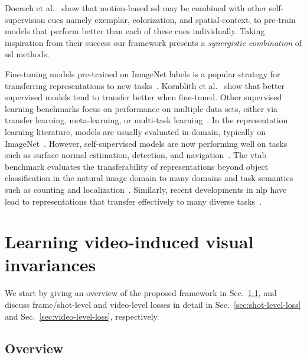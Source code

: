\documentclass[10pt,twocolumn,letterpaper]{article}
\renewcommand{\paragraph}[1]{\noindent{\bf #1}\quad}
\begin{document}
Doersch et al.\ \cite{doersch2017multi} show that motion-based \gls{ssl} may be combined with other self-supervision cues namely exemplar, colorization, and spatial-context, to pre-train models that perform better than each of these cues individually. Taking inspiration from their success our framework presents a \emph{synergistic combination} of \gls{ssl} methods.


\paragraph{Transferable representations}
 Fine-tuning models pre-trained on ImageNet labels is a popular strategy for transferring representations to new tasks~\cite{huh2016makes}.
Kornblith et al.\ \cite{kornblith2018better} show that better supervised models tend to transfer better when fine-tuned.
Other supervised learning benchmarks focus on performance on multiple data sets, either via transfer learning, meta-learning, or multi-task learning~\cite{rebuffi2017,triantafillou2019meta}.
In the representation learning literature, models are usually evaluated in-domain, typically on ImageNet~\cite[and references therein]{zhan2019self}.
However, self-supervised models are now performing well on tasks such as surface normal estimation, detection, and navigation~\cite{goyal2019scaling}.
The \gls{vtab} benchmark evaluates the transferability of representations beyond object classification in the natural image domain to many domains and task semantics such as counting and localization~\cite{zhai2019visual}. 
Similarly, recent developments in \gls{nlp} have lead to representations that transfer effectively to many diverse tasks~\cite{devlin2018bert}.


\section{Learning video-induced visual invariances}

We start by giving an overview of the proposed framework in Sec.~\ref{sec:framework-overview}, and discuss frame/shot-level and video-level losses in detail in Sec.~\ref{sec:shot-level-loss} and Sec.~\ref{sec:video-level-loss}, respectively.


\subsection{Overview} \label{sec:framework-overview}
\end{document}
